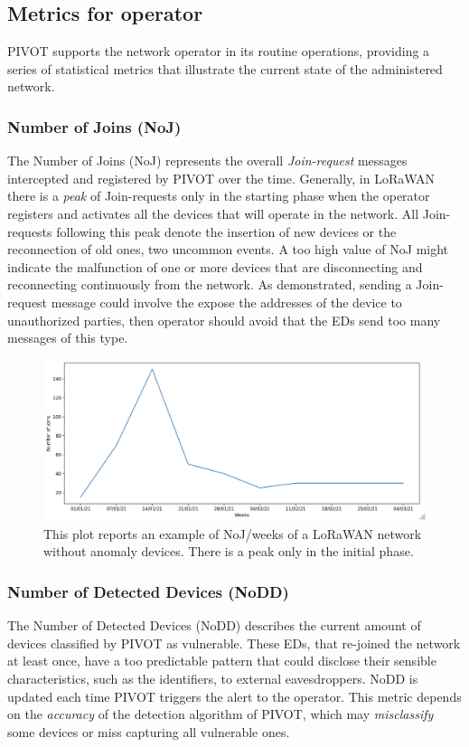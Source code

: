 \subsection{Metrics for operator}
PIVOT supports the network operator in its routine operations, providing a series of statistical metrics that illustrate the current state of the administered network.

\subsubsection{Number of Joins (NoJ)}
The Number of Joins (NoJ) represents the overall \textit{Join-request} messages intercepted and registered by PIVOT over the time. Generally, in LoRaWAN there is a \textit{peak} of Join-requests only in the starting phase when the operator registers and activates all the devices that will operate in the network. All Join-requests following this peak denote the insertion of new devices or the reconnection of old ones, two uncommon events. A too high value of NoJ might indicate the malfunction of one or more devices that are disconnecting and reconnecting continuously from the network. As demonstrated, sending a Join-request message could involve the expose the addresses of the device to unauthorized parties, then operator should avoid that the EDs send too many messages of this type.

\vspace{3mm}
\begin{figure}[H]
    \centering
    \includegraphics[width=0.7\linewidth]{images/pivot/NoJ.png}
    \caption{This plot reports an example of NoJ/weeks of a LoRaWAN network without anomaly devices. There is a peak only in the initial phase.}
    \label{fig:noj}
\end{figure}
\vspace{3mm}

\subsubsection{Number of Detected Devices (NoDD)}
The Number of Detected Devices (NoDD) describes the current amount of devices classified by PIVOT as vulnerable. These EDs, that re-joined the network at least once, have a too predictable pattern that could disclose their sensible characteristics, such as the identifiers, to external eavesdroppers. NoDD is updated each time PIVOT triggers the alert to the operator. This metric depends on the \textit{accuracy} of the detection algorithm of PIVOT, which may \textit{misclassify} some devices or miss capturing all vulnerable ones.

